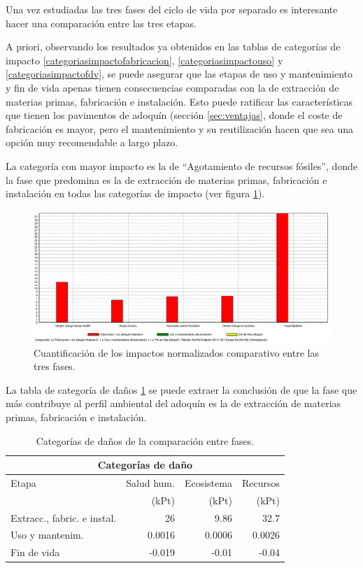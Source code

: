 Una vez estudiadas las tres fases del ciclo de vida por separado es interesante hacer una comparación entre las tres etapas.

A priori, observando los resultados ya obtenidos en las tablas de categorías de impacto \ref{categoriasimpactofabricacion}, \ref{categoriasimpactouso} y \ref{categoriasimpactofdv}, se puede asegurar que las etapas de uso y mantenimiento y fin de vida apenas tienen consecuencias comparadas con la de extracción de materias primas, fabricación e instalación. Esto puede ratificar las características que tienen los pavimentos de adoquín (sección \ref{sec:ventajas}, donde el coste de fabricación es mayor, pero el mantenimiento y su reutilización hacen que sea una opción muy recomendable a largo plazo.

La categoría con mayor impacto es la de ``Agotamiento de recursos fósiles'', donde la fase que predomina es la de extracción de materias primas, fabricación e instalación en todas las categorías de impacto (ver figura \ref{fig:compar_normalizacion}).

\begin{figure}[!htb]
\centering
\includegraphics[width=15cm]{img/compar_normalizacion.png}
\caption{Cuantificación de los impactos normalizados comparativo entre las tres fases.}
\label{fig:compar_normalizacion}
\end{figure}

La tabla de categoría de daños \ref{categoriasdanoscompar} se puede extraer la conclusión de que la fase que más contribuye al perfil ambiental del adoquín es la de extracción de materias primas, fabricación e instalación.

\begin{table}[!htb]
\centering
\begin{tabular}{p{6cm}rrr}
\toprule
\multicolumn{4}{c}{Categorías de daño}\\
\midrule
Etapa & Salud hum. & Ecosistema & Recursos\\
 & (kPt) & (kPt) & (kPt)\\
\midrule
Extracc., fabric. e instal. & 26 & 9.86 & 32.7\\
Uso y mantenim. & 0.0016 & 0.0006 & 0.0026 \\
Fin de vida & -0.019 & -0.01 & -0.04 \\
\bottomrule
\end{tabular}
\caption{Categorías de daños de la comparación entre fases.}
\label{categoriasdanoscompar}
\end{table}

